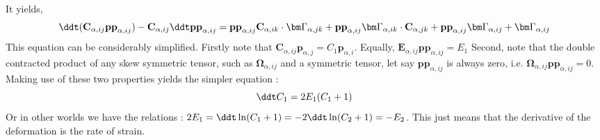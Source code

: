 It yields, 
\begin{equation*}
    \ddt (\textbf{C}_{\alpha,ij} \textbf{pp}_{\alpha,ij})
    - \textbf{C}_{\alpha,ij} \ddt \textbf{pp}_{\alpha,ij} 
    = \textbf{pp}_{\alpha,ij} \textbf{C}_{\alpha,ik} \cdot \bm\Gamma_{\alpha,jk}
    + \textbf{pp}_{\alpha,ij}  \bm\Gamma_{\alpha,ik} \cdot \textbf{C}_{\alpha,jk}
    + \textbf{pp}_{\alpha,ij}  \bm\Gamma_{\alpha,ij} + \bm\Gamma_{\alpha,ij}
\end{equation*}
This equation can be considerably simplified.
Firstly note that $\textbf{C}_{\alpha,ij} \textbf{p}_{\alpha,j} = C_1 \textbf{p}_{\alpha,i}$. 
Equally, $\textbf{E}_{\alpha,ij} \textbf{pp}_{\alpha,ij} =E_1$
Second, note that the double contracted product of any skew symmetric tensor, such as $\bm\Omega_{\alpha,ij}$ and a symmetric tensor, let say $\textbf{pp}_{\alpha,ij}$ is always zero, i.e. $\bm\Omega_{\alpha,ij}\textbf{pp}_{\alpha,ij} = 0$.
Making use of these two properties yields the simpler equation : 
\begin{equation*}
    \ddt C_1
    = 2E_1(C_1+1)
\end{equation*}
Or in other worlds we have the relations : $2 E_1 = \ddt \ln(C_1+1) = - 2 \ddt \ln(C_2+1) = - E_2 $. 
This just means that the derivative of the deformation is the rate of strain. 

